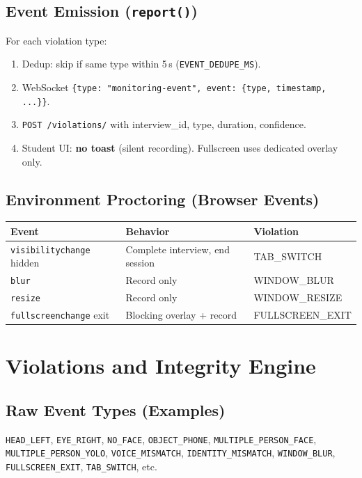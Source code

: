 \documentclass[11pt,a4paper]{report}
\begin{document}
\section{Event Emission (\texttt{report()})}
For each violation type:
\begin{enumerate}
  \item Dedup: skip if same type within 5\,s (\texttt{EVENT\_DEDUPE\_MS}).
  \item WebSocket \texttt{\{type: "monitoring-event", event: \{type, timestamp, ...\}\}}.
  \item \texttt{POST /violations/} with interview\_id, type, duration, confidence.
  \item Student UI: \textbf{no toast} (silent recording). Fullscreen uses dedicated overlay only.
\end{enumerate}

\section{Environment Proctoring (Browser Events)}
\begin{table}[H]
\centering
\small
\begin{tabularx}{\textwidth}{@{}lXl@{}}
\toprule
\textbf{Event} & \textbf{Behavior} & \textbf{Violation} \\
\midrule
\texttt{visibilitychange} hidden & Complete interview, end session & TAB\_SWITCH \\
\texttt{blur} & Record only & WINDOW\_BLUR \\
\texttt{resize} & Record only & WINDOW\_RESIZE \\
\texttt{fullscreenchange} exit & Blocking overlay + record & FULLSCREEN\_EXIT \\
\bottomrule
\end{tabularx}
\end{table}

\chapter{Violations and Integrity Engine}

\section{Raw Event Types (Examples)}
\texttt{HEAD\_LEFT}, \texttt{EYE\_RIGHT}, \texttt{NO\_FACE}, \texttt{OBJECT\_PHONE}, \texttt{MULTIPLE\_PERSON\_FACE}, \texttt{MULTIPLE\_PERSON\_YOLO}, \texttt{VOICE\_MISMATCH}, \texttt{IDENTITY\_MISMATCH}, \texttt{WINDOW\_BLUR}, \texttt{FULLSCREEN\_EXIT}, \texttt{TAB\_SWITCH}, etc.
\end{document}
